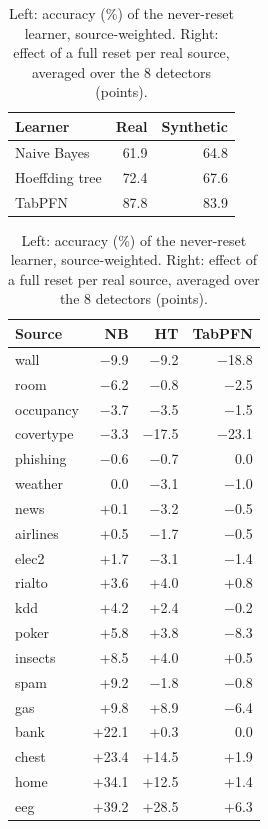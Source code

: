 \begin{table}[h]
\centering
\caption{Left: accuracy (\%) of the never-reset learner, source-weighted. Right: effect of a full reset per real
source, averaged over the 8 detectors (points).}
\label{tab:learners_abs}
\small
\begin{tabular}{lrr}
\toprule
Learner & Real & Synthetic \\
\midrule
Naive Bayes & 61.9 & 64.8 \\
Hoeffding tree & 72.4 & 67.6 \\
TabPFN & 87.8 & 83.9 \\
\bottomrule
\end{tabular}\hspace{2em}
\begin{tabular}{lrrr}
\toprule
Source & NB & HT & TabPFN \\
\midrule
wall & $-$9.9 & $-$9.2 & $-$18.8 \\
room & $-$6.2 & $-$0.8 & $-$2.5 \\
occupancy & $-$3.7 & $-$3.5 & $-$1.5 \\
covertype & $-$3.3 & $-$17.5 & $-$23.1 \\
phishing & $-$0.6 & $-$0.7 & 0.0 \\
weather & 0.0 & $-$3.1 & $-$1.0 \\
news & +0.1 & $-$3.2 & $-$0.5 \\
airlines & +0.5 & $-$1.7 & $-$0.5 \\
elec2 & +1.7 & $-$3.1 & $-$1.4 \\
rialto & +3.6 & +4.0 & +0.8 \\
kdd & +4.2 & +2.4 & $-$0.2 \\
poker & +5.8 & +3.8 & $-$8.3 \\
insects & +8.5 & +4.0 & +0.5 \\
spam & +9.2 & $-$1.8 & $-$0.8 \\
gas & +9.8 & +8.9 & $-$6.4 \\
bank & +22.1 & +0.3 & 0.0 \\
chest & +23.4 & +14.5 & +1.9 \\
home & +34.1 & +12.5 & +1.4 \\
eeg & +39.2 & +28.5 & +6.3 \\
\bottomrule
\end{tabular}
\end{table}
